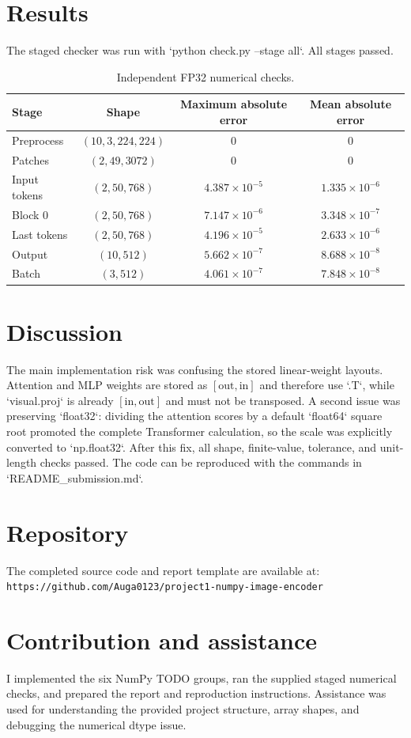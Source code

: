 \documentclass[a4paper,12pt]{article}
\begin{document}
\section{Results}
The staged checker was run with `python check.py --stage all`. All stages passed.
\begin{table}[H]
\centering
\begin{tabular}{lccc}
\toprule
Stage & Shape & Maximum absolute error & Mean absolute error\\
\midrule
Preprocess & $(10,3,224,224)$ & $0$ & $0$\\
Patches & $(2,49,3072)$ & $0$ & $0$\\
Input tokens & $(2,50,768)$ & $4.387\times10^{-5}$ & $1.335\times10^{-6}$\\
Block 0 & $(2,50,768)$ & $7.147\times10^{-6}$ & $3.348\times10^{-7}$\\
Last tokens & $(2,50,768)$ & $4.196\times10^{-5}$ & $2.633\times10^{-6}$\\
Output & $(10,512)$ & $5.662\times10^{-7}$ & $8.688\times10^{-8}$\\
Batch & $(3,512)$ & $4.061\times10^{-7}$ & $7.848\times10^{-8}$\\
\bottomrule
\end{tabular}
\caption{Independent FP32 numerical checks.}
\end{table}

\section{Discussion}
The main implementation risk was confusing the stored linear-weight layouts. Attention and MLP weights are stored as $[\text{out},\text{in}]$ and therefore use `.T`, while `visual.proj` is already $[\text{in},\text{out}]$ and must not be transposed. A second issue was preserving `float32`: dividing the attention scores by a default `float64` square root promoted the complete Transformer calculation, so the scale was explicitly converted to `np.float32`. After this fix, all shape, finite-value, tolerance, and unit-length checks passed. The code can be reproduced with the commands in `README_submission.md`.

\section*{Repository}
The completed source code and report template are available at:\\
\texttt{https://github.com/Auga0123/project1-numpy-image-encoder}

\section*{Contribution and assistance}
I implemented the six NumPy TODO groups, ran the supplied staged numerical checks, and prepared the report and reproduction instructions. Assistance was used for understanding the provided project structure, array shapes, and debugging the numerical dtype issue.
\end{document}
